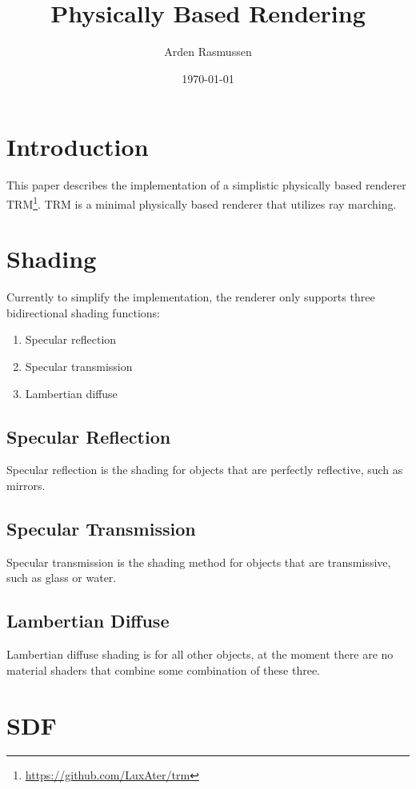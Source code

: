 \documentclass{amsart}
\title{Physically Based Rendering}
\author{Arden Rasmussen}
\date{\today}
\begin{document}
\maketitle

\section{Introduction}%
\label{sec:Introduction}

This paper describes the implementation of a simplistic physically based
renderer TRM\footnote{\url{https://github.com/LuxAter/trm}}. TRM is a minimal
physically based renderer that utilizes ray marching.


\section{Shading}%
\label{sec:Shading}

Currently to simplify the implementation, the renderer only supports three
bidirectional shading functions:
\begin{enumerate}
  \item Specular reflection
  \item Specular transmission
  \item Lambertian diffuse
\end{enumerate}

\subsection{Specular Reflection}%
\label{sub:Specular Reflection}
Specular reflection is the shading for objects that are perfectly reflective,
such as mirrors.

\subsection{Specular Transmission}%
\label{sub:Specular Transmission}
Specular transmission is the shading method for objects that are transmissive,
such as glass or water.

\subsection{Lambertian Diffuse}%
\label{sub:Lambertian Diffuse}
Lambertian diffuse shading is for all other objects, at the moment there are no
material shaders that combine some combination of these three.

\section{SDF}%
\label{sec:sdf}
\end{document}
